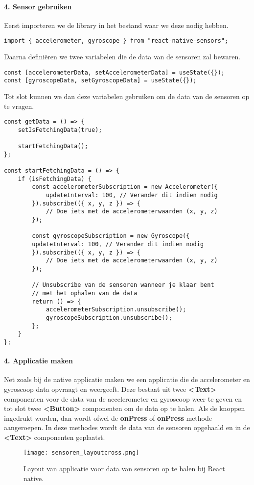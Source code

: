 \paragraph{4. Sensor gebruiken}
Eerst importeren we de library in het bestand waar we deze nodig hebben.
\begin{verbatim}
import { accelerometer, gyroscope } from "react-native-sensors";
\end{verbatim}
Daarna definiëren we twee variabelen die de data van de sensoren zal bewaren.
\begin{verbatim}
const [accelerometerData, setAccelerometerData] = useState({});
const [gyroscopeData, setGyroscopeData] = useState({});
\end{verbatim}
Tot slot kunnen we dan deze variabelen gebruiken om de data van de sensoren op te vragen.
\begin{verbatim}
const getData = () => {
    setIsFetchingData(true);

    startFetchingData();
};

const startFetchingData = () => {
    if (isFetchingData) {
        const accelerometerSubscription = new Accelerometer({
            updateInterval: 100, // Verander dit indien nodig
        }).subscribe(({ x, y, z }) => {
            // Doe iets met de accelerometerwaarden (x, y, z)
        });

        const gyroscopeSubscription = new Gyroscope({
        updateInterval: 100, // Verander dit indien nodig
        }).subscribe(({ x, y, z }) => {
            // Doe iets met de accelerometerwaarden (x, y, z)
        });

        // Unsubscribe van de sensoren wanneer je klaar bent 
        // met het ophalen van de data
        return () => {
            accelerometerSubscription.unsubscribe();
            gyroscopeSubscription.unsubscribe();
        };
    }
};
\end{verbatim}

\paragraph{4. Applicatie maken}
Net zoals bij de native applicatie maken we een applicatie die de accelerometer en gyroscoop data 
opvraagt en weergeeft. Deze bestaat uit twee \textbf{<Text>} componenten voor de data van de
accelerometer en gyroscoop weer te geven en tot slot twee \textbf{<Button>} componenten om de 
data op te halen. Als de knoppen ingedrukt worden, dan wordt ofwel de
\textbf{onPress} of \textbf{onPress} methode aangeroepen. In deze methodes wordt de data 
van de sensoren opgehaald en in de \textbf{<Text>} componenten geplaatst.
\begin{figure}[H]
    \centering
    \texttt{[image: sensoren\_layoutcross.png]}
    \caption{Layout van applicatie voor data van sensoren op te halen bij React native.}
\end{figure}